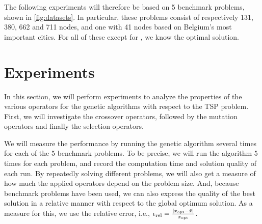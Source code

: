 \documentclass[a4paper,english,11pt,]{scrartcl}
\begin{document}
The following experiments will therefore be based on 5 benchmark problems, shown in \autoref{fig:datasets}. In particular, these problems consist of respectively 131, 380, 662 and 711 nodes, and one with 41 nodes based on Belgium's most important cities. For all of these except for , we know the optimal solution.


%  


\section{Experiments}
% 
In this section, we will perform experiments to analyze the properties of the various operators for the genetic algorithms with respect to the TSP problem. First, we will investigate the crossover operators, followed by the mutation operators and finally the selection operators.


We will measure the performance by running the genetic algorithm several times for each of the 5 benchmark problems. To be precise, we will run the algorithm 5 times for each problem, and record the computation time and solution quality of each run.  By repeatedly solving different problems, we will also get a measure of how much the applied operators depend on the problem size. And, because benchmark problems have been used, we can also express the quality of the best solution in a relative manner with respect to the global optimum solution. As a measure for this, we use the relative error, i.e., $\epsilon_\textnormal{rel} = \frac{|x_\textnormal{opt} - \hat{x}|}{x_\textnormal{opt}}$.
\end{document}
